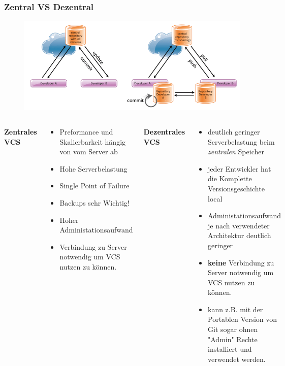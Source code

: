 \documentclass{beamer}
\begin{document}
\begin{frame}\frametitle{Zentral VS Dezentral}
\begin{figure}
\includegraphics[scale=.4]{Bilder/centralVSdecentral}
\end{figure}
\begin{columns}
        \textbf{Zentrales VCS}
\begin{tiny}
\begin{itemize}
\item Preformance und Skalierbarkeit hängig von vom Server ab
\item Hohe Serverbelastung
\item Single Point of Failure
\item Backups sehr Wichtig!
\item Hoher Administationsaufwand
\item Verbindung zu Server notwendig um VCS nutzen zu können.
\end{itemize}
\end{tiny}
        \textbf{Dezentrales VCS}
\begin{tiny}
        \begin{itemize}
\item deutlich geringer Serverbelastung beim \textit{zentralen} Speicher
\item jeder Entwickler hat die Komplette Versionsgeschichte local
\item Administationsaufwand je nach verwendeter Architektur deutlich geringer
\item \textbf{keine }Verbindung zu Server notwendig um VCS nutzen zu können.
\item kann z.B. mit der Portablen Version von Git sogar ohnen "Admin" Rechte installiert und verwendet werden.
\end{itemize}
\end{tiny}
\end{columns}
\end{frame}
\end{document}
